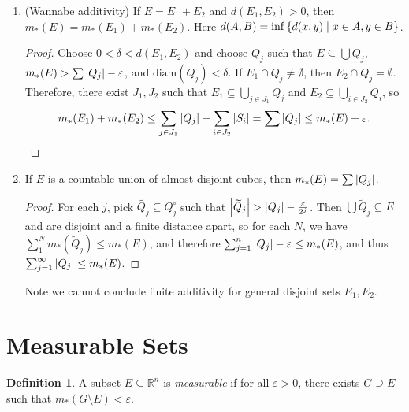 \documentclass[leqno, openany]{memoir}
\theoremstyle{definition}
\newtheorem{defn}[thm]{Definition}
\theoremstyle{remark}
\theoremstyle{plain}
\theoremstyle{definition}
\theoremstyle{remark}
\newcommand{\R}{\mathbb{R}}
\newcommand{\ep}{\varepsilon}
\newcommand{\mr}[1]{\mathrm{#1}}
\newcommand{\wt}[1]{\widetilde{#1}}
\begin{document}
\begin{enumerate}
\begin{proof}
            Now $E \subseteq \bigcup G_j$ and $G = \bigcup G_j$, so \[ m_*(G)
            \leq \sum \qty(\abs{Q_j} + \frac{\ep}{2^j}) \leq \sum \abs{Q_j} +
        \ep \leq m_*(E) + 2 \ep. \qedhere \] \end{proof} \item (Wannabe
        additivity) If $E = E_1 + E_2$ and $d(E_1, E_2) > 0$, then $m_*(E) =
        m_*(E_1) + m_*(E_2)$. Here $d(A,B) = \inf \qty{d(x,y) \mid x \in A, y
        \in B}$.  \begin{proof} Choose $0 < \delta < d(E_1, E_2)$ and choose
            $Q_j$ such that $E \subseteq \bigcup Q_j$, $m_*(E) > \sum \abs{Q_j}
            - \ep$, and $\mr{diam}(Q_j) < \delta$. If $E_1 \cap Q_j \neq
            \emptyset$, then $E_2 \cap Q_j = \emptyset$. Therefore, there exist
            $J_1, J_2$ such that $E_1 \subseteq \bigcup_{j \in J_1} Q_j$ and
            $E_2 \subseteq \bigcup_{i \in J_2} Q_i$, so \[ m_*(E_1) + m_*(E_2)
            \leq \sum_{j \in J_1} \abs{Q_j} + \sum_{i \in J_2} \abs{S_i} = \sum
        \abs{Q_j} \leq m_*(E) + \ep. \qedhere \] \end{proof} \item If $E$ is a
        countable union of almost disjoint cubes, then $m_*(E) = \sum
        \abs{Q_j}$.  \begin{proof} For each $j$, pick $\wt{Q_j} \subseteq
            Q_j^{\circ}$ such that $\abs{\wt{Q}_j} > \abs{Q_j} -
            \frac{\ep}{2^j}$. Then $\bigcup \wt{Q}_j \subseteq E$ and are
            disjoint and a finite distance apart, so for each $N$, we have
            $\sum_1^N m_*(\wt{Q}_j) \leq m_*(E)$, and therefore $\sum_{j=1}^n
            \abs{Q_j} - \ep \leq m_*(E)$, and thus $\sum_{j=1}^{\infty}
            \abs{Q_j} \leq m_*(E)$.  \end{proof} Note we cannot conclude finite
    additivity for general disjoint sets $E_1, E_2$.  \end{enumerate}

\section{Measurable Sets}%

\begin{defn} A subset $E \subseteq \R^n$ is \textit{measurable} if for all $\ep
> 0$, there exists $G \supseteq E$ such that $m_*(G \setminus E) < \ep$.
\end{defn}
\end{document}

